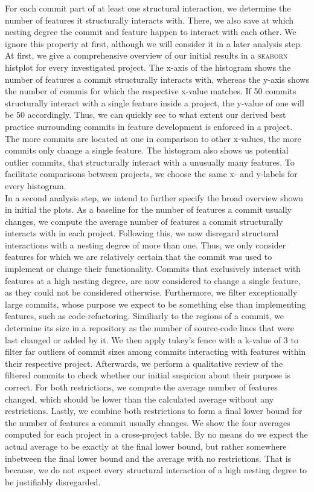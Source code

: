 For each commit part of at least one structural interaction, we determine the number of features it structurally interacts with.
There, we also save at which nesting degree the commit and feature happen to interact with each other.
We ignore this property at first, although we will consider it in a later analysis step.
At first, we give a comprehensive overview of our initial results in a \textsc{seaborn} histplot for every investigated project.
The x-axis of the histogram shows the number of features a commit structurally interacts with, whereas the y-axis shows the number of commis for which the respective x-value matches.
If 50 commits structurally interact with a single feature inside a project, the y-value of one will be 50 accordingly.
Thus, we can quickly see to what extent our derived best practice surrounding commits in feature development is enforced in a project.
The more commits are located at one in comparison to other x-values, the more commits only change a single feature.
The histogram also shows us potential outlier commits, that structurally interact with a unusually many features.
To facilitate comparisons between projects, we choose the same x- and y-labels for every histogram. \\
In a second analysis step, we intend to further specify the broad overview shown in initial the plots.
As a baseline for the number of features a commit usually changes, we compute the average number of features a commit structurally interacts with in each project.
Following this, we now disregard structural interactions with a nesting degree of more than one. 
Thus, we only consider features for which we are relatively certain that the commit was used to implement or change their functionality.
Commits that exclusively interact with features at a high nesting degree, are now considered to change a single feature, as they could not be considered otherwise.
Furthermore, we filter exceptionally large commits, whose purpose we expect to be something else than implementing features, such as code-refactoring.
Similiarly to the regions of a commit, we determine its size in a repository as the number of source-code lines that were last changed or added by it.
We then apply tukey's fence with a k-value of 3 to filter far outliers of commit sizes among commits interacting with features within their respective project.
Afterwards, we perform a qualitative review of the filtered commits to check whether our initial suspicion about their purpose is correct.
For both restrictions, we compute the average number of features changed, which should be lower than the calculated average without any restrictions.
Lastly, we combine both restrictions to form a final lower bound for the number of features a commit usually changes.
We show the four averages computed for each project in a cross-project table. 
By no means do we expect the actual average to be exactly at the final lower bound, but rather somewhere inbetween the final lower bound and the average with no restrictions.
That is because, we do not expect every structural interaction of a high nesting degree to be justifiably disregarded.

